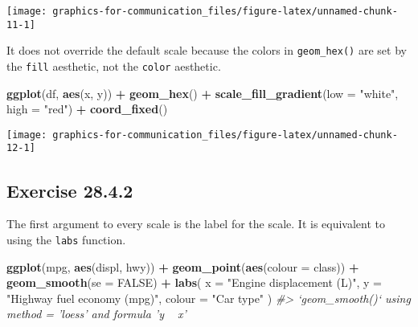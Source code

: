 \documentclass[]{book}
\newenvironment{Shaded}{\begin{snugshade}}{\end{snugshade}}
\newcommand{\CommentTok}[1]{\textcolor[rgb]{0.56,0.35,0.01}{\textit{#1}}}
\newcommand{\DataTypeTok}[1]{\textcolor[rgb]{0.13,0.29,0.53}{#1}}
\newcommand{\KeywordTok}[1]{\textcolor[rgb]{0.13,0.29,0.53}{\textbf{#1}}}
\newcommand{\NormalTok}[1]{#1}
\newcommand{\OperatorTok}[1]{\textcolor[rgb]{0.81,0.36,0.00}{\textbf{#1}}}
\newcommand{\OtherTok}[1]{\textcolor[rgb]{0.56,0.35,0.01}{#1}}
\newcommand{\StringTok}[1]{\textcolor[rgb]{0.31,0.60,0.02}{#1}}
\theoremstyle{plain}
\theoremstyle{remark}
\begin{document}
\begin{center}\texttt{[image: graphics-for-communication\_files/figure-latex/unnamed-chunk-11-1]} \end{center}

It does not override the default scale because the colors in
\texttt{geom\_hex()} are set by the \texttt{fill} aesthetic, not the
\texttt{color} aesthetic.

\begin{Shaded}
\begin{Highlighting}[]
\KeywordTok{ggplot}\NormalTok{(df, }\KeywordTok{aes}\NormalTok{(x, y)) }\OperatorTok{+}
\StringTok{  }\KeywordTok{geom_hex}\NormalTok{() }\OperatorTok{+}
\StringTok{  }\KeywordTok{scale_fill_gradient}\NormalTok{(}\DataTypeTok{low =} \StringTok{"white"}\NormalTok{, }\DataTypeTok{high =} \StringTok{"red"}\NormalTok{) }\OperatorTok{+}
\StringTok{  }\KeywordTok{coord_fixed}\NormalTok{()}
\end{Highlighting}
\end{Shaded}

\begin{center}\texttt{[image: graphics-for-communication\_files/figure-latex/unnamed-chunk-12-1]} \end{center}

\hypertarget{exercise-28.4.2}{%
\subsection*{\texorpdfstring{Exercise
{28.4.2}}{Exercise 28.4.2}}\label{exercise-28.4.2}}

The first argument to every scale is the label for the scale. It is
equivalent to using the \texttt{labs} function.

\begin{Shaded}
\begin{Highlighting}[]
\KeywordTok{ggplot}\NormalTok{(mpg, }\KeywordTok{aes}\NormalTok{(displ, hwy)) }\OperatorTok{+}
\StringTok{  }\KeywordTok{geom_point}\NormalTok{(}\KeywordTok{aes}\NormalTok{(}\DataTypeTok{colour =}\NormalTok{ class)) }\OperatorTok{+}
\StringTok{  }\KeywordTok{geom_smooth}\NormalTok{(}\DataTypeTok{se =} \OtherTok{FALSE}\NormalTok{) }\OperatorTok{+}
\StringTok{  }\KeywordTok{labs}\NormalTok{(}
    \DataTypeTok{x =} \StringTok{"Engine displacement (L)"}\NormalTok{,}
    \DataTypeTok{y =} \StringTok{"Highway fuel economy (mpg)"}\NormalTok{,}
    \DataTypeTok{colour =} \StringTok{"Car type"}
\NormalTok{  )}
\CommentTok{#> `geom_smooth()` using method = 'loess' and formula 'y ~ x'}
\end{Highlighting}
\end{Shaded}
\end{document}
